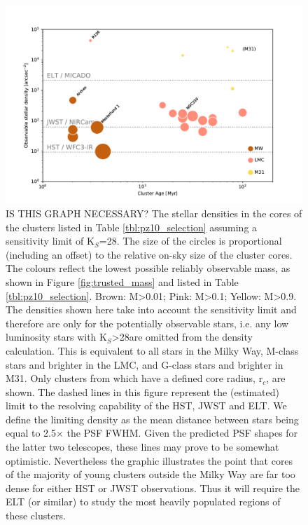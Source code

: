 \begin{figure}

    \centering
    \includegraphics[width=\textwidth]{images/star_density_vs_age}

    \caption{\rewrite IS THIS GRAPH NECESSARY? 
    The stellar densities in the cores of the clusters listed in Table \ref{tbl:pz10_selection} assuming a sensitivity limit of K$_S$=28\m. 
    The size of the circles is proportional (including an offset) to the relative on-sky size of the cluster cores. 
    The colours reflect the lowest possible reliably observable mass, as shown in Figure \ref{fig:trusted_mass} and listed in Table \ref{tbl:pz10_selection}. 
    Brown: M\textgreater0.01\msun; Pink: M\textgreater0.1\msun; Yellow: M\textgreater0.9\msun. 
    The densities shown here take into account the sensitivity limit and therefore are only for the potentially observable stars, i.e. any low luminosity stars with K$_S$\textgreater28\m are omitted from the density calculation. 
    This is equivalent to all stars in the Milky Way, M-class stars and brighter in     the LMC, and G-class stars and brighter in M31. 
    Only clusters from \citet{portegies2010} which have a defined core radius, r$_c$, are shown.
    The dashed lines in this figure represent the (estimated) limit to the resolving capability of the HST, JWST and ELT. 
    We define the limiting density as the mean distance between stars being equal to 2.5$\times$ the PSF FWHM.
    Given the predicted PSF shapes for the latter two telescopes, these lines may prove to be somewhat optimistic. 
    Nevertheless the graphic illustrates the point that cores of the majority of young clusters outside the Milky Way are far too dense for either HST or JWST observations.
    Thus it will require the ELT (or similar) to study the most heavily populated regions of these clusters.}
    
    \label{fig:star_density_vs_age}
    
\end{figure}


